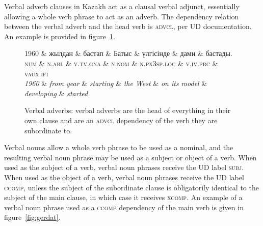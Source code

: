 \documentclass[a4paper,11pt, onecolumn,twoside]{article}
\newcommand{\gmk}[1]{{\rm {\ll \textsc{#1}}}}
\newcommand{\tgloss}[1]{{\em #1}}
\newcommand{\udtag}[1]{{\ll \textsc{#1}}}
\newcommand{\udlabel}[1]{{\udfont #1}}
\begin{document}
Verbal adverb clauses in Kazakh act as a clausal verbal adjunct, essentially allowing a whole verb phrase to act as an adverb.  The dependency relation between the verbal adverb and the head verb is \udtag{advcl}, per UD documentation.  An example is provided in figure~\ref{fig:gna}.

\begin{figure}[!htbp]
	\centering
	\begin{dependency}[theme = simple, font = \small]
		\begin{deptext}[column sep=0.08cm]
			1960 \& жылдан \& бастап \& Батыс \& үлгісінде \& дами \& бастады. \\
			\gmk{num} \& \gmk{n.abl} \& \gmk{v.tv.gna} \& \gmk{n.nom} \& \gmk{n.px3sp.loc} \& \gmk{v.iv.prc} \& \gmk{vaux.ifi} \\
			\tgloss{1960} \& \tgloss{from year} \& \tgloss{starting} \& \tgloss{the West} \& \tgloss{on its model} \& \tgloss{developing} \& \tgloss{started} \\
		\end{deptext}
		\depedge{2}{1}{\udlabel{amod}}
		\depedge{3}{2}{\udlabel{nmod}}
		\depedge{6}{3}{\udlabel{advcl}}
		\deproot[edge unit distance=1.3ex]{6}{\udlabel{root}}
	\end{dependency}
	\caption{Verbal adverbs: verbal adverbs are the head of everything in their own clause and are an \udtag{advcl} dependency of the verb they are subordinate to.}\label{fig:gna}
\end{figure}

Verbal nouns allow a whole verb phrase to be used as a nominal, and the resulting verbal noun phrase may be used as a subject or object of a verb.  When used as the subject of a verb, verbal noun phrases receive the UD label \udtag{subj}.  When used as the object of a verb, verbal noun phrases receive the UD label \udtag{ccomp}, unless the subject of the subordinate clause is obligatorily identical to the subject of the main clause, in which case it receives \udtag{xcomp}.  An example of a verbal noun phrase used as a \udtag{ccomp} dependency of the main verb is given in figure~\ref{fig:gerdat}.
\end{document}
